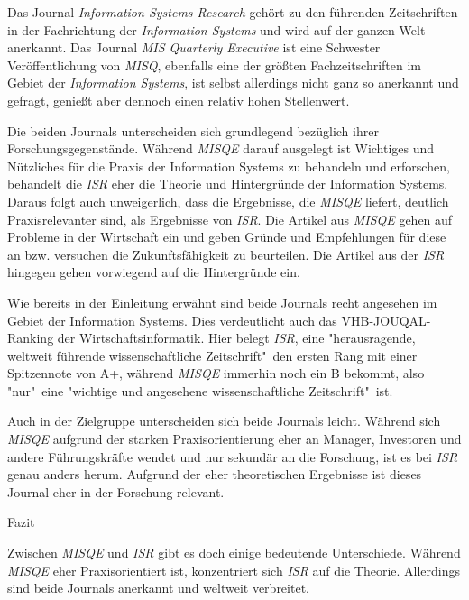 \documentclass[12pt,utf8]{scrartcl}
\begin{document}
Das Journal \emph{Information Systems Research} gehört zu den führenden Zeitschriften in der Fachrichtung der \emph{Information Systems} und wird auf der ganzen Welt anerkannt. Das Journal \emph{MIS Quarterly Executive} ist eine Schwester Veröffentlichung von \emph{MISQ}\citep{MISQE}, ebenfalls eine der größten Fachzeitschriften im Gebiet der \emph{Information Systems}, ist selbst allerdings nicht ganz so anerkannt und gefragt, genießt aber dennoch einen relativ hohen Stellenwert.

Die beiden Journals unterscheiden sich grundlegend bezüglich ihrer Forschungsgegenstände. Während \emph{MISQE} darauf ausgelegt ist Wichtiges und Nützliches für die Praxis der Information Systems zu behandeln und erforschen\citep{MISQE}, behandelt die \emph{ISR} eher die Theorie und Hintergründe der Information Systems\citep{ISR}. Daraus folgt auch unweigerlich, dass die Ergebnisse, die \emph{MISQE} liefert, deutlich Praxisrelevanter sind, als Ergebnisse von \emph{ISR}. Die Artikel aus \emph{MISQE} gehen auf Probleme in der Wirtschaft ein und geben Gründe und Empfehlungen für diese an bzw. versuchen die Zukunftsfähigkeit zu beurteilen\citep{Chasin2017}\cite{Lacity2017}. Die Artikel aus der \emph{ISR} hingegen gehen vorwiegend auf die Hintergründe ein\cite{Karhu2018}\cite{Constantinides2018}.

Wie bereits in der Einleitung erwähnt sind beide Journals recht angesehen im Gebiet der Information Systems. Dies verdeutlicht auch das VHB-JOUQAL-Ranking der Wirtschaftsinformatik. Hier belegt \emph{ISR}, eine "herausragende, weltweit führende wissenschaftliche Zeitschrift"\ den ersten Rang mit einer Spitzennote von A+, während \emph{MISQE} immerhin noch ein B bekommt, also "nur"\ eine "wichtige und angesehene wissenschaftliche Zeitschrift"\ ist\cite{VHBJ}.

Auch in der Zielgruppe unterscheiden sich beide Journals leicht. Während sich \emph{MISQE} aufgrund der starken Praxisorientierung eher an Manager, Investoren und andere Führungskräfte\citep{Chasin2017}\citep{MISQE} wendet und nur sekundär an die Forschung, ist es bei \emph{ISR} genau anders herum. Aufgrund der eher theoretischen Ergebnisse ist dieses Journal eher in der Forschung relevant\citep{ISR}. 
\newline

{\Large Fazit}

Zwischen \emph{MISQE} und \emph{ISR} gibt es doch einige bedeutende Unterschiede. Während \emph{MISQE} eher Praxisorientiert ist, konzentriert sich \emph{ISR} auf die Theorie. Allerdings sind beide Journals anerkannt und weltweit verbreitet. 
\end{document}
